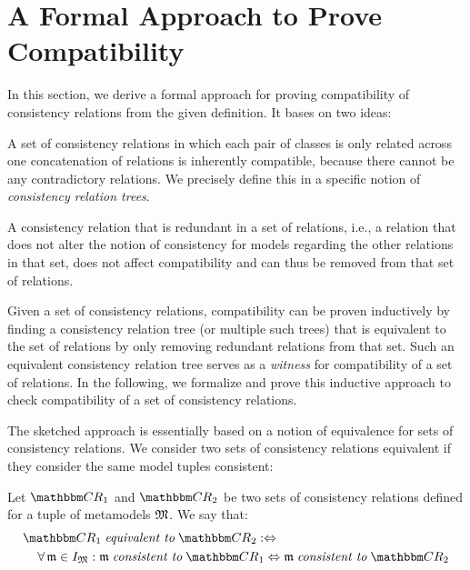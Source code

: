 \section{A Formal Approach to Prove Compatibility}
\label{chap:compatibility:formal_approach}

In this section, we derive a formal approach for proving compatibility of consistency relations from the given definition.
It bases on two ideas:
\begin{longenumerate}
    \item A set of consistency relations in which each pair of classes is only related across one concatenation of relations is inherently compatible, because there cannot be any contradictory relations. We precisely define this in a specific notion of \emph{consistency relation trees}.
    \item A consistency relation that is redundant in a set of relations, i.e., a relation that does not alter the notion of consistency for models regarding the other relations in that set, does not affect compatibility and can thus be removed from that set of relations.
\end{longenumerate}
Given a set of consistency relations, compatibility can be proven inductively by finding a consistency relation tree (or multiple such trees) that is equivalent to the set of relations by only removing redundant relations from that set.
Such an equivalent consistency relation tree serves as a \emph{witness} for compatibility of a set of relations.
In the following, we formalize and prove this inductive approach to check compatibility of a set of consistency relations.

The sketched approach is essentially based on a notion of equivalence for sets of consistency relations.
We consider two sets of consistency relations equivalent if they consider the same model tuples consistent:

\begin{definition}
\label{def:equivalence}
    Let $\consistencyrelationset{CR}_{1}$ and $\consistencyrelationset{CR}_{2}$ be two sets of consistency relations defined for a tuple of metamodels $\metamodeltuple{M}$.
    We say that:
    \begin{align*}
        &
        \consistencyrelationset{CR}_{1} \equivalenttomath \consistencyrelationset{CR}_{2} \equivalentperdefinition \\
        & \formulaskip
        \forall \modeltuple{m} \in \metamodeltupleinstanceset{M} : \modeltuple{m} \consistenttomath \consistencyrelationset{CR}_{1} \equivalent \modeltuple{m} \consistenttomath \consistencyrelationset{CR}_{2}
    \end{align*}
\end{definition}

